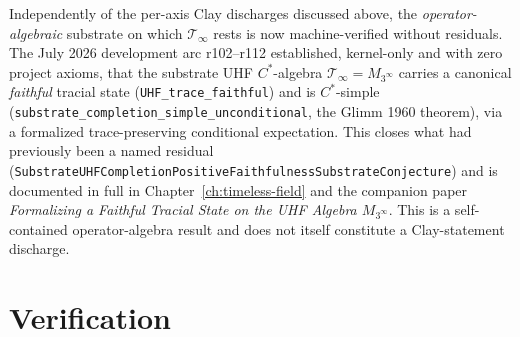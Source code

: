 \begin{remark}
Independently of the per-axis Clay discharges discussed above, the
\emph{operator-algebraic} substrate on which $\mathcal{T}_\infty$ rests is
now machine-verified without residuals. The July 2026 development arc
r102--r112 established, kernel-only and with zero project axioms, that the
substrate UHF $C^*$-algebra $\mathcal{T}_\infty = M_{3^\infty}$ carries a
canonical \emph{faithful} tracial state (\texttt{UHF\_trace\_faithful})
and is $C^*$-simple (\texttt{substrate\_completion\_simple\_unconditional},
the Glimm 1960 theorem), via a formalized trace-preserving conditional
expectation. This closes what had previously been a named residual
(\texttt{SubstrateUHFCompletionPositiveFaithfulnessSubstrateConjecture})
and is documented in full in Chapter~\ref{ch:timeless-field} and the
companion paper \emph{Formalizing a Faithful Tracial State on the UHF
Algebra $M_{3^\infty}$}. This is a self-contained operator-algebra result
and does not itself constitute a Clay-statement discharge.
\end{remark}

\section{Verification}
\label{sec:substrate-theorem-verification}

